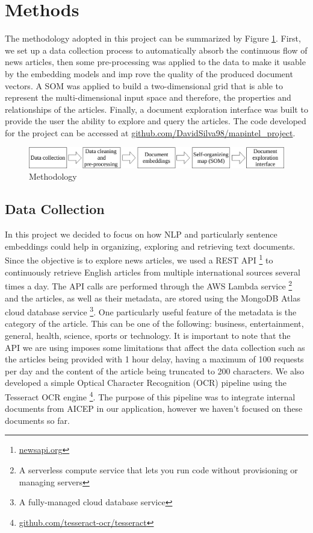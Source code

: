\documentclass[a4paper]{article}
\begin{document}
\section*{Methods}
The methodology adopted in this project can be summarized by Figure \ref{Methodology}. First, we set up a data collection process to automatically absorb the continuous flow of news articles, then some pre-processing was applied to the data to make it usable by the embedding models and imp  rove the quality of the produced document vectors. A SOM was applied to build a two-dimensional grid that is able to represent the multi-dimensional input space and therefore, the properties and relationships of the articles. Finally, a document exploration interface was built to provide the user the ability to explore and query the articles. The code developed for the project can be accessed at \href{https://github.com/DavidSilva98/mapintel_project}{github.com/DavidSilva98/mapintel\_project}.
\begin{figure}[H]
	\centering
	\includegraphics[scale=0.7]{./figures/methodology}
	\caption{Methodology}
	\label{Methodology}
\end{figure}
\subsection*{Data Collection}
In this project we decided to focus on how NLP and particularly sentence embeddings could help in organizing, exploring and retrieving text documents. Since the objective is to explore news articles, we used a REST API \footnote{\href{https://newsapi.org/}{newsapi.org}} to continuously retrieve English articles from multiple international sources several times a day. The API calls are performed through the AWS Lambda service \footnote{A serverless compute service that lets you run code without provisioning or managing servers} and the articles, as well as their metadata, are stored using the MongoDB Atlas cloud database service \footnote{A fully-managed cloud database service}. One particularly useful feature of the metadata is the category of the article. This can be one of the following: business, entertainment, general, health, science, sports or technology. It is important to note that the API we are using imposes some limitations that affect the data collection such as the articles being provided with 1 hour delay, having a maximum of 100 requests per day and the content of the article being truncated to 200 characters. We also developed a simple Optical Character Recognition (OCR) pipeline using the Tesseract OCR engine \footnote{\href{https://github.com/tesseract-ocr/tesseract}{github.com/tesseract-ocr/tesseract}}. The purpose of this pipeline was to integrate internal documents from AICEP in our application, however we haven't focused on these documents so far.
\end{document}
